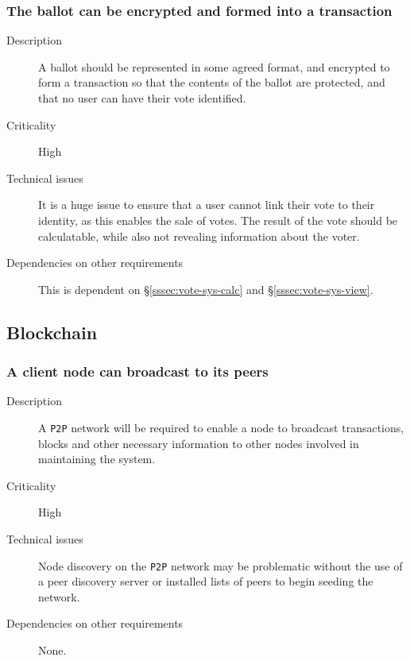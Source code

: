 \documentclass[a4paper,12pt]{article}
\begin{document}
\subsubsection{The ballot can be encrypted and formed into a transaction}
\label{sssec:ballot-enc-trans}
\begin{description}
	\item[Description]
		A ballot should be represented in some agreed format, and encrypted to form a transaction so that the contents of the ballot are protected, and that no user can have their vote identified.
	\item[Criticality]
		High
	\item[Technical issues]
		It is a huge issue to ensure that a user cannot link their vote to their identity, as this enables the sale of votes. The result of the vote should be calculatable, while also not revealing information about the voter.
	\item[Dependencies on other requirements]
		This is dependent on \S\ref{sssec:vote-sys-calc} and \S\ref{sssec:vote-sys-view}.
\end{description}

\subsection{Blockchain}
\label{subsec:blockchain}

\subsubsection{A client node can broadcast to its peers}
\label{sssec:blk-comms}
\begin{description}
	\item[Description]
		A \texttt{P2P} network will be required to enable a node to broadcast transactions, blocks and other necessary information to other nodes involved in maintaining the system.
	\item[Criticality]
		High
	\item[Technical issues]
		Node discovery on the \texttt{P2P} network may be problematic without the use of a peer discovery server or installed lists of peers to begin seeding the network.
	\item[Dependencies on other requirements]
		None.
\end{description}
\end{document}

